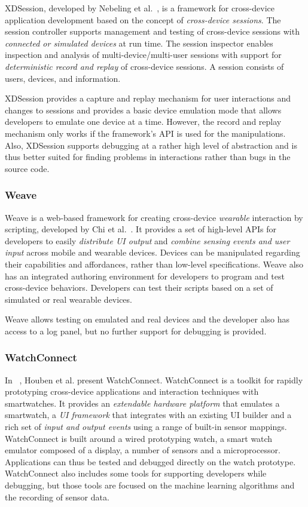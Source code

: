 XDSession, developed by Nebeling et al.~\cite{xdsession2015}, is a framework for cross-device application development based on the concept of \emph{cross-device sessions}. The session controller supports management and testing of cross-device sessions with \emph{connected or simulated devices} at run time. The session inspector enables inspection and analysis of multi-device/multi-user sessions with support for \emph{deterministic record and replay} of cross-device sessions. A session consists of users, devices, and information.

XDSession provides a capture and replay mechanism for user interactions and changes to sessions and provides a basic device emulation mode that allows developers to emulate one device at a time. However, the record and replay mechanism only works if the framework's API is used for the manipulations. Also, XDSession supports debugging at a rather high level of abstraction and is thus better suited for finding problems in interactions rather than bugs in the source code.

\subsubsection{Weave}

Weave is a web-based framework for creating cross-device \emph{wearable} interaction by scripting, developed by Chi et al.~\cite{weave2015}. It provides a set of high-level APIs for developers to easily \emph{distribute UI output} and \emph{combine sensing events and user input} across mobile and wearable devices. Devices can be manipulated regarding their capabilities and affordances, rather than low-level specifications. Weave also has an integrated authoring environment for developers to program and test cross-device behaviors. Developers can test their scripts based on a set of simulated or real wearable devices.

Weave allows testing on emulated and real devices and the developer also has access to a log panel, but no further support for debugging is provided. 

\subsubsection{WatchConnect}

In ~\cite{watchconnect2015}, Houben et al. present WatchConnect. WatchConnect is a toolkit for rapidly prototyping cross-device applications and interaction techniques with smartwatches. It provides an \emph{extendable hardware platform} that emulates a smartwatch, a \emph{UI framework} that integrates with an existing UI builder and a rich set of \emph{input and output events} using a range of built-in sensor mappings. WatchConnect is built around a wired prototyping watch, a smart watch emulator composed of a display, a number of sensors and a microprocessor. Applications can thus be tested and debugged directly on the watch prototype. WatchConnect also includes some tools for supporting developers while debugging, but those tools are focused on the machine learning algorithms and the recording of sensor data.

